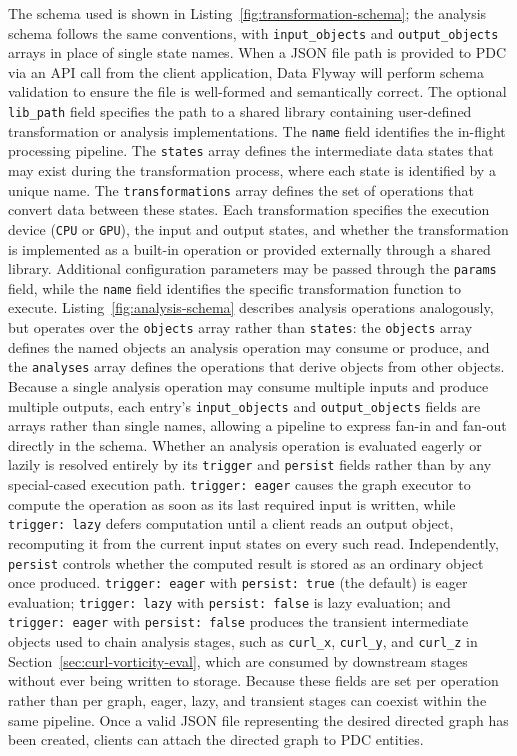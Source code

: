 The schema used is shown in Listing~\ref{fig:transformation-schema}; the analysis schema follows the same conventions, with \texttt{input\_objects} and \texttt{output\_objects} arrays in place of single state names. When a JSON file path is provided to PDC via an API call from the client application, Data Flyway will perform schema validation to ensure the file is well-formed and semantically correct. The optional \texttt{lib\_path} field specifies the path to a shared library containing user-defined transformation or analysis implementations. The \texttt{name} field identifies the in-flight processing pipeline. The \texttt{states} array defines the intermediate data states that may exist during the transformation process, where each state is identified by a unique name. The \texttt{transformations} array defines the set of operations that convert data between these states. Each transformation specifies the execution device (\texttt{CPU} or \texttt{GPU}), the input and output states, and whether the transformation is implemented as a built-in operation or provided externally through a shared library. Additional configuration parameters may be passed through the \texttt{params} field, while the \texttt{name} field identifies the specific transformation function to execute. Listing~\ref{fig:analysis-schema} describes analysis operations analogously, but operates over the \texttt{objects} array rather than \texttt{states}: the \texttt{objects} array defines the named objects an analysis operation may consume or produce, and the \texttt{analyses} array defines the operations that derive objects from other objects. Because a single analysis operation may consume multiple inputs and produce multiple outputs, each entry's \texttt{input\_objects} and \texttt{output\_objects} fields are arrays rather than single names, allowing a pipeline to express fan-in and fan-out directly in the schema. Whether an analysis operation is evaluated eagerly or lazily is resolved entirely by its \texttt{trigger} and \texttt{persist} fields rather than by any special-cased execution path. \texttt{trigger: eager} causes the graph executor to compute the operation as soon as its last required input is written, while \texttt{trigger: lazy} defers computation until a client reads an output object, recomputing it from the current input states on every such read. Independently, \texttt{persist} controls whether the computed result is stored as an ordinary object once produced. \texttt{trigger: eager} with \texttt{persist: true} (the default) is eager evaluation; \texttt{trigger: lazy} with \texttt{persist: false} is lazy evaluation; and \texttt{trigger: eager} with \texttt{persist: false} produces the transient intermediate objects used to chain analysis stages, such as \texttt{curl\_x}, \texttt{curl\_y}, and \texttt{curl\_z} in Section~\ref{sec:curl-vorticity-eval}, which are consumed by downstream stages without ever being written to storage. Because these fields are set per operation rather than per graph, eager, lazy, and transient stages can coexist within the same pipeline. Once a valid JSON file representing the desired directed graph has been created, clients can attach the directed graph to PDC entities.
